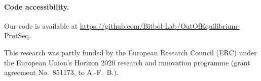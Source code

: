 \documentclass[
 reprint,








nobibnotes,

 amsmath,amssymb,
 aps,
 prl,
 longbibliography






]{revtex4-2}
\begin{document}
\paragraph*{Code accessibility.} Our code is available at \url{https://github.com/Bitbol-Lab/OutOfEquilibrium-ProtSeq}.


\begin{acknowledgments}
This research was partly funded by the European Research Council (ERC) under the European Union’s Horizon 2020 research and innovation programme (grant agreement No.~851173, to A.-F.~B.).
\end{acknowledgments}
\end{document}
